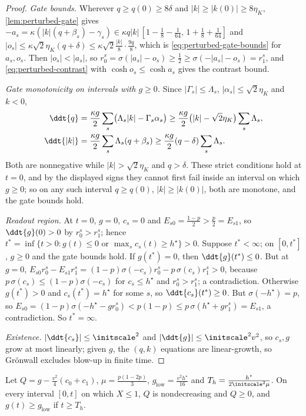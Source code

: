 \begin{proof}
\emph{Gate bounds.} Wherever $q\ge q(0)\ge8\delta$ and $|k|\ge|k(0)|\ge8\eta_K$, \cref{lem:perturbed-gate} gives
$-a_s=\kappa(|k|(q+\beta_s)-\gamma_s)\in\kappa q|k|\,[1-\frac18-\frac1{64},\,1+\frac18+\frac1{64}]$ and
$|o_s|\le\kappa\sqrt2\eta_K(q+\delta)\le\kappa\sqrt2\frac{|k|}8\cdot\frac{9q}8$, which is \cref{eq:perturbed-gate-bounds} for $a_s,o_s$. Then $|o_s|<|a_s|$,
so $r^s_0=\sigma(|a_s|-o_s)\ge\frac12\ge\sigma(-|a_s|-o_s)=r^s_1$, and \cref{eq:perturbed-contrast} with $\cosh o_s\le\cosh a_s$ gives the contrast bound.

\emph{Gate monotonicity on intervals with $g\ge0$.} Since $|\Gamma_s|\le\Lambda_s$, $|\alpha_s|\le\sqrt2\eta_K$ and $k<0$,
\[
 \begin{aligned}
 \ddt{q}&=\frac{\kappa g}{2}\sum_s\bigl(\Lambda_s|k|-\Gamma_s\alpha_s\bigr)
 \ge\frac{\kappa g}{2}\bigl(|k|-\sqrt2\eta_K\bigr)\sum_s\Lambda_s,\\
 \ddt{|k|}&=\frac{\kappa g}{2}\sum_s\Lambda_s(q+\beta_s)
 \ge\frac{\kappa g}{2}(q-\delta)\sum_s\Lambda_s.
 \end{aligned}
\]
Both are nonnegative while $|k|>\sqrt2\eta_K$ and $q>\delta$. These strict conditions hold at $t=0$, and by the displayed signs they cannot first fail
inside an interval on which $g\ge0$; so on any such interval $q\ge q(0)$, $|k|\ge|k(0)|$, both are monotone, and the gate bounds hold.

\emph{Readout region.} At $t=0$, $g=0$, $c_s=0$ and $E_{s0}=\frac{1-p}2>\frac p2=E_{s1}$, so $\ddt{g}(0)>0$ by $r^s_0>r^s_1$; hence
$t^\ast=\inf\{t>0:g(t)\le0\text{ or }\max_sc_s(t)\ge h^\star\}>0$. Suppose $t^\ast<\infty$; on $[0,t^\ast]$, $g\ge0$ and the gate bounds hold.
If $g(t^\ast)=0$, then $\ddt{g}(t^\ast)\le0$. But at $g=0$, $E_{s0}r^s_0-E_{s1}r^s_1=(1-p)\sigma(-c_s)r^s_0-p\,\sigma(c_s)r^s_1>0$, because
$p\,\sigma(c_s)\le(1-p)\sigma(-c_s)$ for $c_s\le h^\star$ and $r^s_0>r^s_1$; a contradiction. Otherwise $g(t^\ast)>0$ and $c_s(t^\ast)=h^\star$ for some
$s$, so $\ddt{c_s}(t^\ast)\ge0$. But $\sigma(-h^\star)=p$, so $E_{s0}=(1-p)\sigma(-h^\star-gr^s_0)<p(1-p)\le p\,\sigma(h^\star+gr^s_1)=E_{s1}$, a contradiction.
So $t^\ast=\infty$.

\emph{Existence.} $|\ddt{c_s}|\le\initscale^2$ and $|\ddt{g}|\le\initscale^2v^2$, so $c_s,g$ grow at most linearly; given $g$, the $(q,k)$ equations are
linear-growth, so Gr\"onwall excludes blow-up in finite time.
\end{proof}

\begin{lemma}
\label{lem:perturbed-floor}
Let $Q=g-\frac{v^2}4(c_0+c_1)$, $\mu=\frac{p(1-2p)}3$, $g_{\mathrm{low}}=\frac{v^2h^\star}{16}$ and $T_h=\frac{h^\star}{2\initscale^2\mu}$.
On every interval $[0,t]$ on which $X\le1$, $Q$ is nondecreasing and $Q\ge0$, and $g(t)\ge g_{\mathrm{low}}$ if $t\ge T_h$.
\end{lemma}

